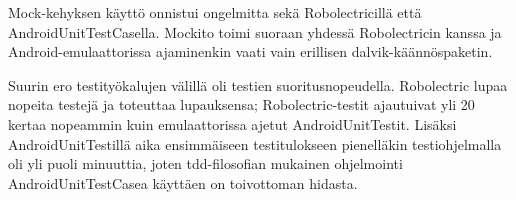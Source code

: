 Mock-kehyksen käyttö onnistui ongelmitta sekä Robolectricillä että AndroidUnitTestCasella. Mockito toimi suoraan yhdessä Robolectricin kanssa ja Android-emulaattorissa ajaminenkin vaati vain erillisen dalvik-käännöspaketin.

Suurin ero testityökalujen välillä oli testien suoritusnopeudella. Robolectric lupaa nopeita testejä ja toteuttaa lupauksensa; Robolectric-testit ajautuivat yli 20 kertaa nopeammin kuin emulaattorissa ajetut AndroidUnitTestit. Lisäksi AndroidUnitTestillä aika ensimmäiseen testitulokseen pienelläkin testiohjelmalla oli yli puoli minuuttia, joten tdd-filosofian mukainen ohjelmointi AndroidUnitTestCasea käyttäen on toivottoman hidasta.